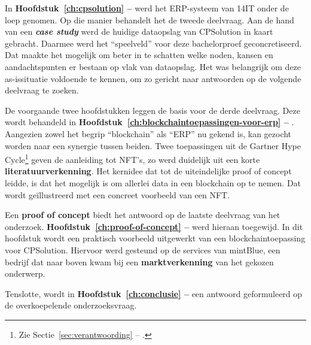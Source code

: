 In \textbf{Hoofdstuk~\ref{ch:cpsolution} -- } werd het ERP-systeem van 14IT onder de loep genomen. Op die manier behandelt het de tweede deelvraag. Aan de hand van een \textbf{\textit{case study}} werd de huidige dataopslag van CPSolution in kaart gebracht. Daarmee werd het ``speelveld'' voor deze bachelorproef geconcretiseerd. Dat maakte het mogelijk om beter in te schatten welke noden, kansen en aandachtspunten er bestaan op vlak van dataopslag. Het was belangrijk om deze as-issituatie voldoende te kennen, om zo gericht naar antwoorden op de volgende deelvraag te zoeken.

De voorgaande twee hoofdstukken leggen de basis voor de derde deelvraag. Deze wordt behandeld in \textbf{Hoofdstuk~\ref{ch:blockchaintoepassingen-voor-erp} -- }. Aangezien zowel het begrip ``blockchain'' als ``ERP'' nu gekend is, kan gezocht worden naar een synergie tussen beiden. Twee toepassingen uit de Gartner Hype Cycle\footnote{Zie Sectie~\ref{sec:verantwoording} -- .} geven de aanleiding tot NFT's, zo werd duidelijk uit een korte \textbf{literatuurverkenning}. Het kernidee dat tot de uiteindelijke proof of concept leidde, is dat het mogelijk is om allerlei data in een blockchain op te nemen. Dat wordt geïllustreerd met een concreet voorbeeld van een NFT.

Een \textbf{proof of concept} biedt het antwoord op de laatste deelvraag van het onderzoek. \textbf{Hoofdstuk~\ref{ch:proof-of-concept} -- } werd hieraan toegewijd. In dit hoofdstuk wordt een praktisch voorbeeld uitgewerkt van een blockchaintoepassing voor CPSolution. Hiervoor werd gesteund op de services van mintBlue, een bedrijf dat naar boven kwam bij een \textbf{marktverkenning} van het gekozen onderwerp.

Tenslotte, wordt in \textbf{Hoofdstuk~\ref{ch:conclusie} -- } een antwoord geformuleerd op de overkoepelende onderzoeksvraag. 

